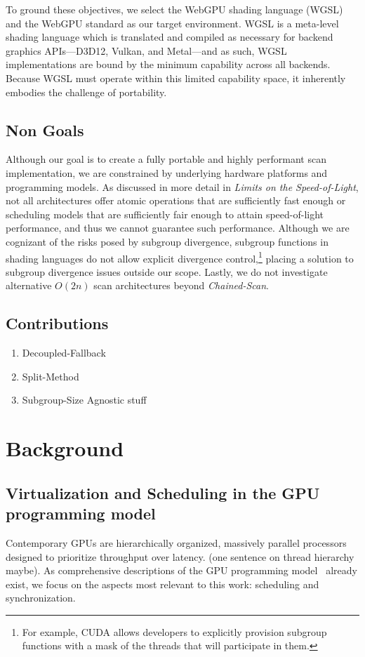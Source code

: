 \documentclass[sigconf]{acmart}
\begin{document}
\noindent
To ground these objectives, we select the WebGPU shading language (WGSL) and the WebGPU standard as our target environment. WGSL is a meta-level shading language which is translated and compiled as necessary for backend graphics APIs---D3D12, Vulkan, and Metal---and as such, WGSL implementations are bound by the minimum capability across all backends. Because WGSL must operate within this limited capability space, it inherently embodies the challenge of portability.

\subsection{Non Goals}
Although our goal is to create a fully portable and highly performant scan implementation, we are constrained by underlying hardware platforms and programming models. As discussed in more detail in \emph{Limits on the Speed-of-Light}, not all architectures offer atomic operations that are sufficiently fast enough or scheduling models that are sufficiently fair enough to attain speed-of-light performance, and thus we cannot guarantee such performance. Although we are cognizant of the risks posed by subgroup divergence, subgroup functions in shading languages do not allow explicit divergence control,\footnote{For example, CUDA allows developers to explicitly provision subgroup functions with a mask of the threads that will participate in them.} placing a solution to subgroup divergence issues outside our scope. Lastly, we do not investigate alternative $O(2n)$ scan architectures beyond \emph{Chained-Scan}.

\subsection{Contributions}
\begin{enumerate}
  \item Decoupled-Fallback
  \item Split-Method
  \item Subgroup-Size Agnostic stuff
\end{enumerate}

\section{Background}
\subsection{Virtualization and Scheduling in the GPU programming model}
Contemporary GPUs are hierarchically organized, massively parallel processors designed to prioritize throughput over latency. (one sentence on thread hierarchy maybe). As comprehensive descriptions of the GPU programming model~\cite{} already exist, we focus on the aspects most relevant to this work: scheduling and synchronization.
\end{document}

